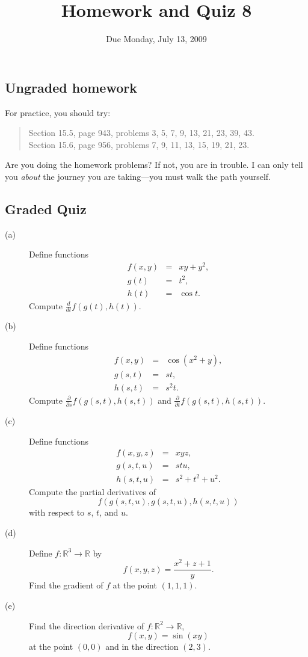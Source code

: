 \documentclass[11pt]{article}
\title{Homework and Quiz 8}
\date{Due Monday, July 13, 2009}
\newcommand{\R}{\mathbb{R}}
\begin{document}
\maketitle

\subsection*{Ungraded homework}

For practice, you should try:
\begin{quote}
  Section 15.5, page 943, problems 3, 5, 7, 9, 13, 21, 23, 39, 43. \\
  Section 15.6, page 956, problems 7, 9, 11, 13, 15, 19, 21, 23.
\end{quote}
Are you doing the homework problems?  If not, you are in trouble.  I
can only tell you \textit{about} the journey you are taking---you must
walk the path yourself.

\vfill

\subsection*{Graded Quiz}

\begin{description}
\item[(a)] Define functions
\begin{eqnarray*}
f(x,y) &=& xy + y^2, \\
g(t) &=& t^2, \\
h(t) &=& \cos t.
\end{eqnarray*}
Compute $\displaystyle\frac{d}{dt} f(g(t),h(t))$.
\vfill
\item[(b)] Define functions
\begin{eqnarray*}
f(x,y) &=& \cos \left(x^2 + y\right), \\
g(s,t) &=& st, \\
h(s,t) &=& s^2 t.
\end{eqnarray*}
Compute $\displaystyle\frac{\partial}{\partial s} f(g(s,t),h(s,t))$ and $\displaystyle\frac{\partial}{\partial t} f(g(s,t),h(s,t))$.
\vfill
\item[(c)] Define functions
\begin{eqnarray*}
f(x,y,z) &=& xyz,\\
g(s,t,u) &=& stu, \\
h(s,t,u) &=& s^2 + t^2 + u^2.
\end{eqnarray*}
Compute the partial derivatives of
$$
f\left(g\left(s,t,u\right),g\left(s,t,u\right),h\left(s,t,u\right)\right)
$$
with respect to $s$, $t$, and $u$.
\vfill
\item[(d)] Define $f : \R^3 \to \R$ by
$$
f(x,y,z) = \frac{x^2+z+1}{y}.
$$
Find the gradient of $f$ at the point $(1,1,1)$.
\vfill
\item[(e)] Find the direction derivative of $f : \R^2 \to \R$,
$$
f(x,y) = \sin \left(xy\right)
$$
at the point $(0,0)$ and in the direction $(2,3)$.
\vfill
\end{description}
\end{document}
